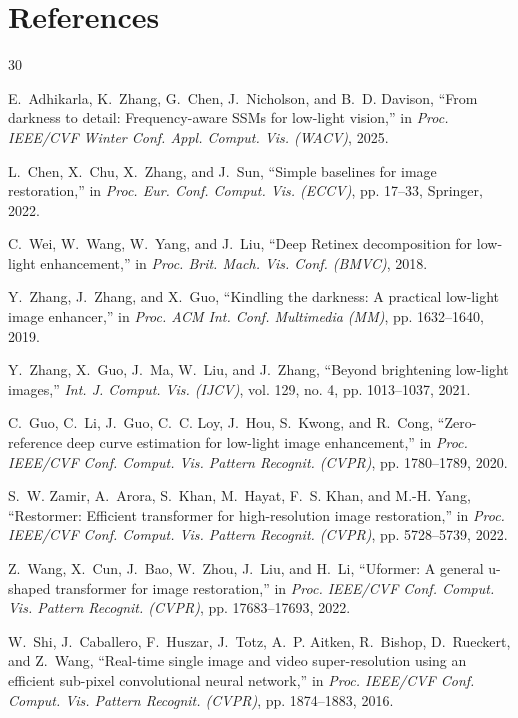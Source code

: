 \documentclass[journal,onecolumn,11pt]{IEEEtran}
\begin{document}
\section{References}
\begin{thebibliography}{30}

E.~Adhikarla, K.~Zhang, G.~Chen, J.~Nicholson, and B.~D. Davison, ``From darkness to detail: Frequency-aware SSMs for low-light vision,'' in \emph{Proc. IEEE/CVF Winter Conf. Appl. Comput. Vis. (WACV)}, 2025.

L.~Chen, X.~Chu, X.~Zhang, and J.~Sun, ``Simple baselines for image restoration,'' in \emph{Proc. Eur. Conf. Comput. Vis. (ECCV)}, pp. 17--33, Springer, 2022.

C.~Wei, W.~Wang, W.~Yang, and J.~Liu, ``Deep Retinex decomposition for low-light enhancement,'' in \emph{Proc. Brit. Mach. Vis. Conf. (BMVC)}, 2018.

Y.~Zhang, J.~Zhang, and X.~Guo, ``Kindling the darkness: A practical low-light image enhancer,'' in \emph{Proc. ACM Int. Conf. Multimedia (MM)}, pp. 1632--1640, 2019.

Y.~Zhang, X.~Guo, J.~Ma, W.~Liu, and J.~Zhang, ``Beyond brightening low-light images,'' \emph{Int. J. Comput. Vis. (IJCV)}, vol. 129, no. 4, pp. 1013--1037, 2021.

C.~Guo, C.~Li, J.~Guo, C.~C. Loy, J.~Hou, S.~Kwong, and R.~Cong, ``Zero-reference deep curve estimation for low-light image enhancement,'' in \emph{Proc. IEEE/CVF Conf. Comput. Vis. Pattern Recognit. (CVPR)}, pp. 1780--1789, 2020.

S.~W. Zamir, A.~Arora, S.~Khan, M.~Hayat, F.~S. Khan, and M.-H. Yang, ``Restormer: Efficient transformer for high-resolution image restoration,'' in \emph{Proc. IEEE/CVF Conf. Comput. Vis. Pattern Recognit. (CVPR)}, pp. 5728--5739, 2022.

Z.~Wang, X.~Cun, J.~Bao, W.~Zhou, J.~Liu, and H.~Li, ``Uformer: A general u-shaped transformer for image restoration,'' in \emph{Proc. IEEE/CVF Conf. Comput. Vis. Pattern Recognit. (CVPR)}, pp. 17683--17693, 2022.

W.~Shi, J.~Caballero, F.~Huszar, J.~Totz, A.~P. Aitken, R.~Bishop, D.~Rueckert, and Z.~Wang, ``Real-time single image and video super-resolution using an efficient sub-pixel convolutional neural network,'' in \emph{Proc. IEEE/CVF Conf. Comput. Vis. Pattern Recognit. (CVPR)}, pp. 1874--1883, 2016.


\end{thebibliography}
\end{document}
